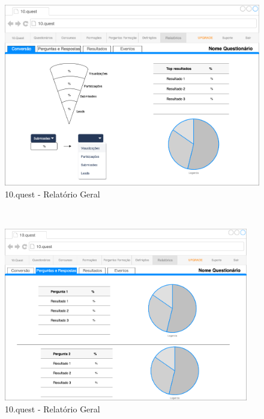 \begin{figure}[ht!]
	\begin{center}
		\includegraphics[width=1\textwidth]{img/prototipos/r1.png}
		\caption{10.quest - Relatório Geral}
		\label{10q-r1}
	\end{center}
\end{figure}
\mbox{ }
\newpage
\begin{figure}[ht!]
	\begin{center}
		\includegraphics[width=0.95\textwidth]{img/prototipos/r2.png}
		\caption{10.quest - Relatório Geral}
		\label{10q-r2}
	\end{center}
\end{figure}
\mbox{ }
